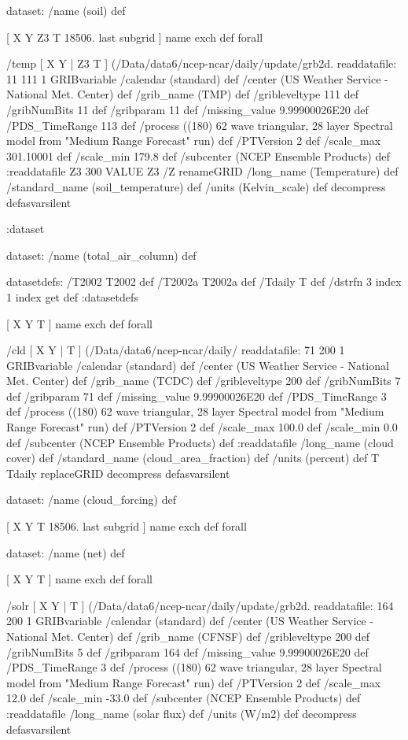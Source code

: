 \begin{ingrid}

 dataset: /name (soil) def

  [ X Y Z3 T 18506. last subgrid ] { name exch def } forall

  /temp { [ X Y | Z3 T ] (/Data/data6/ncep-ncar/daily/update/grb2d.%
  readdatafile:
  11 111 1 GRIBvariable
  /calendar (standard) def
  /center (US Weather Service - National Met. Center) def
  /grib_name (TMP) def
  /gribleveltype 111 def
  /gribNumBits 11 def
  /gribparam 11 def
  /missing_value 9.99900026E20 def 
  /PDS_TimeRange 113 def
  /process ((180) 62 wave triangular, 28 layer Spectral model from "Medium Range Forecast" run) def
  /PTVersion 2 def
  /scale_max 301.10001 def
  /scale_min 179.8 def
  /subcenter (NCEP Ensemble Products) def
  :readdatafile
  Z3 300 VALUE
  Z3 /Z renameGRID
  /long_name (Temperature) def
  /standard_name (soil_temperature) def
  /units (Kelvin_scale) def
  decompress
  } defasvarsilent

 :dataset

 dataset: /name (total_air_column) def

  datasetdefs:
  /T2002 T2002 def
  /T2002a T2002a def
  /Tdaily T def
  /dstrfn 3 index 1 index get def
  :datasetdefs

  [ X Y T ] { name exch def } forall

  /cld { [ X Y | T ] (/Data/data6/ncep-ncar/daily/%
  readdatafile:
  71 200 1 GRIBvariable
  /calendar (standard) def
  /center (US Weather Service - National Met. Center) def
  /grib_name (TCDC) def
  /gribleveltype 200 def
  /gribNumBits 7 def
  /gribparam 71 def
  /missing_value 9.99900026E20 def 
  /PDS_TimeRange 3 def
  /process ((180) 62 wave triangular, 28 layer Spectral model from "Medium Range Forecast" run) def
  /PTVersion 2 def
  /scale_max 100.0 def
  /scale_min 0.0 def
  /subcenter (NCEP Ensemble Products) def
  :readdatafile
  /long_name (cloud cover) def
  /standard_name (cloud_area_fraction) def
  /units (percent) def
  T Tdaily replaceGRID
  decompress
  } defasvarsilent
 
  dataset: /name (cloud_forcing) def 

   [ X Y T 18506. last subgrid ] { name exch def } forall

   dataset: /name (net) def

    [ X Y T ] { name exch def } forall

    /solr { [ X Y | T ] (/Data/data6/ncep-ncar/daily/update/grb2d.%
    readdatafile:
    164 200 1 GRIBvariable
    /calendar (standard) def
    /center (US Weather Service - National Met. Center) def
    /grib_name (CFNSF) def
    /gribleveltype 200 def
    /gribNumBits 5 def
    /gribparam 164 def
    /missing_value 9.99900026E20 def
    /PDS_TimeRange 3 def
    /process ((180) 62 wave triangular, 28 layer Spectral model from "Medium Range Forecast" run) def
    /PTVersion 2 def
    /scale_max 12.0 def
    /scale_min -33.0 def
    /subcenter (NCEP Ensemble Products) def
    :readdatafile
    /long_name (solar flux) def
    /units (W/m2) def
    decompress
    } defasvarsilent
 

\end{ingrid}
